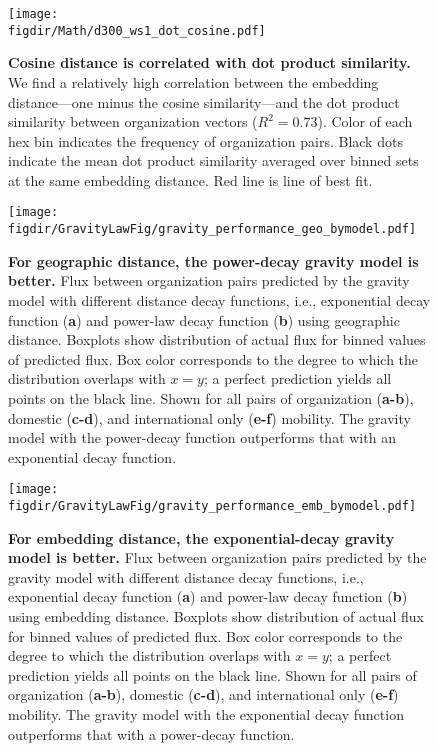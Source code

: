 \documentclass[12pt]{article} %
\def\figdir{../Figs}
\begin{document}
%
%
\begin{figure}[p!]
	\centering
	\texttt{[image: \\figdir/Math/d300\_ws1\_dot\_cosine.pdf]}
	\caption{
		\textbf{Cosine distance is correlated with dot product similarity.}
		We find a relatively high correlation between the embedding distance---one minus the cosine similarity---and the dot product similarity between organization vectors ($R^2 = 0.73$).
		Color of each hex bin indicates the frequency of organization pairs. 
		Black dots indicate the mean dot product similarity averaged over binned sets at the same embedding distance.
		Red line is line of best fit.
	}
	\label{fig:supp:cosdot}
\end{figure}



%
%
\begin{figure}[p!]
	\centering
	\texttt{[image: \\figdir/GravityLawFig/gravity\_performance\_geo\_bymodel.pdf]}
	\caption{
		\textbf{For geographic distance, the power-decay gravity model is better.}
		Flux between organization pairs predicted by the gravity model with different distance decay functions, i.e., exponential decay function (\textbf{a}) and power-law decay function (\textbf{b}) using geographic distance.
		Boxplots show distribution of actual flux for binned values of predicted flux.
		Box color corresponds to the degree to which the distribution overlaps with $x = y$; 
		a perfect prediction yields all points on the black line.
		Shown for all pairs of organization (\textbf{a-b}), domestic (\textbf{c-d}), and international only (\textbf{e-f}) mobility.
		The gravity model with the power-decay function outperforms that with an exponential decay function.
	}
	\label{fig:supp:predict_geo_bymodel}
\end{figure}



%
%
\begin{figure}[p!]
	\centering
	\texttt{[image: \\figdir/GravityLawFig/gravity\_performance\_emb\_bymodel.pdf]}
	\caption{
		\textbf{For embedding distance, the exponential-decay gravity model is better.}
		Flux between organization pairs predicted by the gravity model with different distance decay functions, i.e., exponential decay function (\textbf{a}) and power-law decay function (\textbf{b}) using embedding distance.
		Boxplots show distribution of actual flux for binned values of predicted flux.
		Box color corresponds to the degree to which the distribution overlaps with $x = y$; 
		a perfect prediction yields all points on the black line.
		Shown for all pairs of organization (\textbf{a-b}), domestic (\textbf{c-d}), and international only (\textbf{e-f}) mobility.
		The gravity model with the exponential decay function outperforms that with a power-decay function.
	}
	\label{fig:supp:predict_emb_bymodel}
\end{figure}
\end{document}
